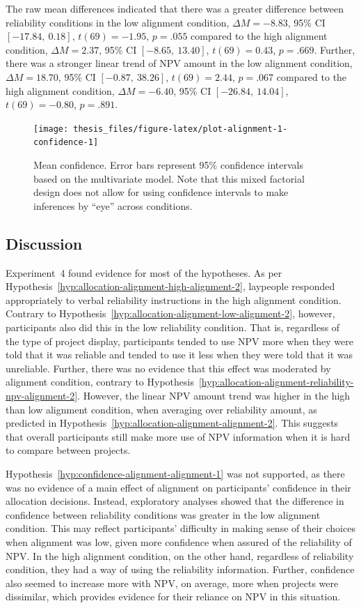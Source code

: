 \documentclass[a4paper, nobind, dvipsnames]{templates/ociamthesis}
\theoremstyle{definition}
\theoremstyle{definition}
\theoremstyle{definition}
\theoremstyle{definition}
\theoremstyle{remark}
\begin{document}
The raw mean differences indicated that there was a greater difference between
reliability conditions in the low alignment condition,
\(\Delta M = -8.83\), 95\% CI \([-17.84,~0.18]\), \(t(69) = -1.95\), \(p = .055\) compared to the high alignment
condition, \(\Delta M = 2.37\), 95\% CI \([-8.65,~13.40]\), \(t(69) = 0.43\), \(p = .669\). Further, there was
a stronger linear trend of NPV amount in the low alignment condition,
\(\Delta M = 18.70\), 95\% CI \([-0.87,~38.26]\), \(t(69) = 2.44\), \(p = .067\) compared to the high alignment
condition, \(\Delta M = -6.40\), 95\% CI \([-26.84,~14.04]\), \(t(69) = -0.80\), \(p = .891\).



\begin{figure}
\texttt{[image: thesis\_files/figure-latex/plot-alignment-1-confidence-1]} \caption{Mean confidence. Error bars represent 95\% confidence intervals based on the multivariate model. Note that this mixed factorial design does not allow for using confidence intervals to make inferences by ``eye'' across conditions.}\label{fig:plot-alignment-1-confidence}
\end{figure}

\subsection{Discussion}

Experiment~4 found evidence for most of the hypotheses. As per
Hypothesis~\ref{hyp:allocation-alignment-high-alignment-2}, laypeople responded
appropriately to verbal reliability instructions in the high alignment
condition. Contrary to
Hypothesis~\ref{hyp:allocation-alignment-low-alignment-2}, however,
participants also did this in the low reliability condition. That is, regardless
of the type of project display, participants tended to use NPV more when they
were told that it was reliable and tended to use it less when they were told
that it was unreliable. Further, there was no evidence that this effect was
moderated by alignment condition, contrary to
Hypothesis~\ref{hyp:allocation-alignment-reliability-npv-alignment-2}. However,
the linear NPV amount trend was higher in the high than low alignment condition,
when averaging over reliability amount, as predicted in
Hypothesis~\ref{hyp:allocation-alignment-alignment-2}. This suggests that
overall participants still make more use of NPV information when it is hard to
compare between projects.

Hypothesis~\ref{hyp:confidence-alignment-alignment-1} was not supported, as
there was no evidence of a main effect of alignment on participants' confidence
in their allocation decisions. Instead, exploratory analyses showed that the
difference in confidence between reliability conditions was greater in the low
alignment condition. This may reflect participants' difficulty in making sense
of their choices when alignment was low, given more confidence when assured of
the reliability of NPV. In the high alignment condition, on the other hand,
regardless of reliability condition, they had a way of using the reliability
information. Further, confidence also seemed to increase more with NPV, on
average, more when projects were dissimilar, which provides evidence for their
reliance on NPV in this situation.
\end{document}
